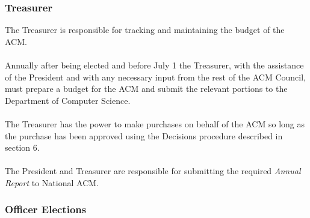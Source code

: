 \documentclass[12pt,titlepage]{article}
\begin{document}
\subsubsection{Treasurer}

The Treasurer is responsible for tracking and maintaining the budget of the ACM.\\
\\
Annually after being elected and before July 1 the Treasurer, with the assistance of the President and with any necessary input from the rest of the ACM Council, must prepare a budget for the ACM and submit the relevant portions to the Department of Computer Science.\\
\\
The Treasurer has the power to make purchases on behalf of the ACM so long as the purchase has been approved using the Decisions procedure described in section 6.\\
\\
The President and Treasurer are responsible for submitting the required \emph{Annual Report} to National ACM.

\subsubsection{Officer Elections}
\end{document}
